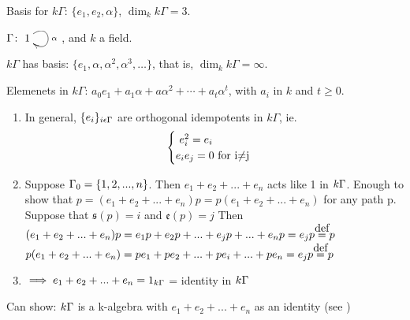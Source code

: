 Basis for $k\Gamma$: $\{ e_1, e_2, \alpha\}$, $\dim_kk\Gamma = 3$.

\begin{exam}
$\Gamma\colon \xymatrix{1\ar@(ur,dr)[]^\alpha}$, and $k$ a field.

$k\Gamma$ has basis: $\{e_1, \alpha, \alpha^2, \alpha^3, \ldots\}$,
that is, $\dim_k k\Gamma = \infty$. 

Elemenets in $k\Gamma$: $a_0e_1 + a_1\alpha + a\alpha^2 + \cdots +
a_t\alpha^t$, with $a_i$ in $k$ and $t\geqslant 0$.  
\end{exam}

\begin{note}
\begin{enumerate}
	\item  In general, $\{e_i\}_{i\epsilon\Gamma}$ are orthogonal idempotents in $k\Gamma$, ie. 
	\[ \begin{cases}\text{\ $e_i^2 = e_i$}\notag\\
	\text{$e_ie_j = 0$ for i$\neq$j}\notag
	\end{cases}\]
	
	\item Suppose $\Gamma_0 = \{1,2,...,n\}$. Then $e_1 + e_2 + ... + e_n$ acts like 1 in $k\Gamma$. Enough to show that $p = (e_1 + e_2 + ... + e_n)p = p(e_1 + e_2 + ... + e_n)$ for any path p. Suppose that $\mathfrak{s}(p) = i$ and $\mathfrak{e}(p) = j$ Then
	\newline $(e_1 + e_2 + ... + e_n)p = e_1p + e_2p + ... + e_jp + ... + e_np = e_jp \defeq p$ \newline
	\newline $p(e_1 + e_2 + ... + e_n) = pe_1 + pe_2 + ... + pe_i + ... + pe_n = e_jp \defeq p$ \newline
	
	\item $\implies e_1 + e_2 + ... + e_n = 1_{k\Gamma}$ = identity in $k\Gamma$ 
\end{enumerate}
Can show: $k\Gamma$ is a k-algebra with $e_1 + e_2 + ... + e_n$ as an identity (see \cite[page 50]{ARS})\newline
\end{note}

